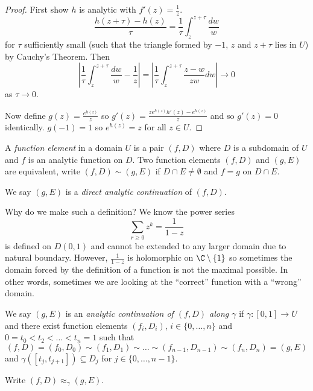 \documentclass[a4paper]{article}
\begin{document}
\begin{proof}
  First show \(h\) is analytic with \(f'(z) = \frac{1}{z}\).
  \[
    \frac{h(z + \tau) - h(z)}{\tau}
    = \frac{1}{\tau} \int_z^{z + \tau} \frac{dw}{w}
  \]
  for \(\tau\) sufficiently small (such that the triangle formed by \(-1\), \(z\) and \(z + \tau\) lies in \(U\)) by Cauchy's Theorem. Then
  \[
    \left| \frac{1}{\tau} \int_z^{z + \tau} \frac{dw}{w} - \frac{1}{z} \right|
    = \left| \frac{1}{\tau} \int_z^{z + \tau} \frac{z - w}{zw} dw \right|
    \to 0
  \]
  as \(\tau \to 0\).

  Now define \(g(z) = \frac{e^{h(z)}}{z}\) so \(g'(z) = \frac{z e^{h(z)} h'(z) - e^{h(z)}}{z}\) and so \(g'(z) = 0\) identically. \(g(-1) = 1\) so \(e^{h(z)} = z\) for all \(z \in U\).

\end{proof}

\begin{definition}
  A \emph{function element} in a domain \(U\) is a pair \((f, D)\) where \(D\) is a subdomain of \(U\) and \(f\) is an analytic function on \(D\). Two function elements \((f, D)\) and \((g, E)\) are equivalent, write \((f, D) \sim (g, E)\) if \(D \cap E \neq \emptyset\) and \(f = g\) on \(D \cap E\).

  We say \((g, E)\) is a \emph{direct analytic continuation} of \((f, D)\).
\end{definition}

Why do we make such a definition? We know the power series
\[
  \sum_{r \geq 0} z^k = \frac{1}{1 - z}
\]
is defined on \(D(0, 1)\) and cannot be extended to any larger domain due to natural boundary. However, \(\frac{1}{1 - z}\) is holomorphic on \(\C \setminus \{1\}\) so sometimes the domain forced by the definition of a function is not the maximal possible. In other words, sometimes we are looking at the ``correct'' function with a ``wrong'' domain.

\begin{definition}
  We say \((g, E)\) is an \emph{analytic continuation of \((f, D)\) along \(\gamma\)} if \(\gamma: [0, 1] \to U\) and there exist function elements \((f_i, D_i)\), \(i \in \{0, \dots, n\}\) and \(0 = t_0 < t_2 < \dots < t_n = 1\) such that
  \[
    (f, D) = (f_0, D_0) \sim (f_1, D_1) \sim \dots \sim (f_{n - 1}, D_{n - 1}) \sim (f_n, D_n) = (g, E)
  \]
  and \(\gamma([t_j, t_{j + 1}]) \subseteq D_j\) for \(j \in \{0, \dots, n - 1\}\).

  Write \((f, D) \approx_\gamma (g, E)\).
\end{definition}
\end{document}

